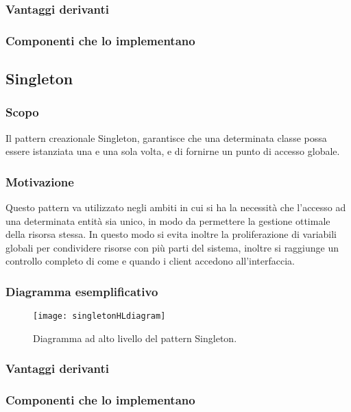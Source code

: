 \subsubsection{Vantaggi derivanti}

\subsubsection{Componenti che lo implementano}

\subsection{Singleton}

\subsubsection{Scopo}
Il pattern creazionale Singleton, garantisce che una determinata classe possa essere istanziata una e una sola volta, e di fornirne un punto di accesso globale.

\subsubsection{Motivazione}
Questo pattern va utilizzato negli ambiti in cui si ha la necessità che l'accesso ad una determinata entità sia unico, in modo da permettere la gestione ottimale della risorsa stessa. In questo modo si evita inoltre la proliferazione di variabili globali per condividere risorse con più parti del sistema, inoltre si raggiunge un controllo completo di come e quando i client accedono all'interfaccia.
\subsubsection{Diagramma esemplificativo}
\begin{figure}[h]
\centering
\texttt{[image: singletonHLdiagram]}
\caption{Diagramma ad alto livello del pattern Singleton.}\label{fig:singletonHL}
\end{figure}

\subsubsection{Vantaggi derivanti}

\subsubsection{Componenti che lo implementano}

